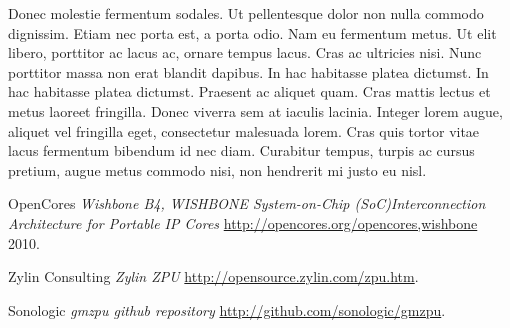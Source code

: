 \documentclass[a4paper,twocolumn,12pt]{article}
\begin{document}
Donec molestie fermentum sodales. Ut pellentesque dolor non nulla commodo dignissim. Etiam nec porta est, a porta odio. Nam eu fermentum metus. Ut elit libero, porttitor ac lacus ac, ornare tempus lacus. Cras ac ultricies nisi. Nunc porttitor massa non erat blandit dapibus. In hac habitasse platea dictumst. In hac habitasse platea dictumst. Praesent ac aliquet quam. Cras mattis lectus et metus laoreet fringilla. Donec viverra sem at iaculis lacinia. Integer lorem augue, aliquet vel fringilla eget, consectetur malesuada lorem. Cras quis tortor vitae lacus fermentum bibendum id nec diam. Curabitur tempus, turpis ac cursus pretium, augue metus commodo nisi, non hendrerit mi justo eu nisl. 

\begin{thebibliography}{9}

 OpenCores \emph{Wishbone B4, WISHBONE System-on-Chip (SoC)Interconnection Architecture for Portable IP Cores} \url{http://opencores.org/opencores,wishbone} 2010.

 Zylin Consulting \emph{Zylin ZPU} \url{http://opensource.zylin.com/zpu.htm}.

 Sonologic \emph{gmzpu github repository} \url{http://github.com/sonologic/gmzpu}.

\end{thebibliography}
\end{document}
